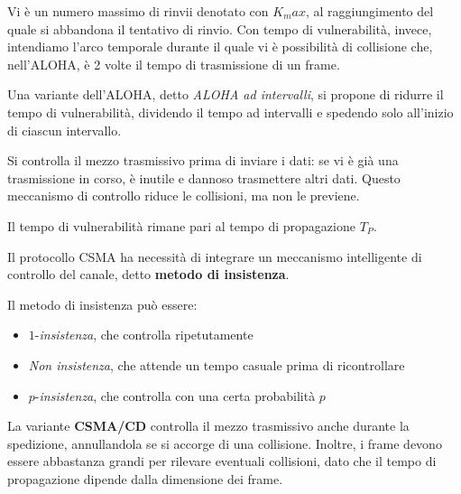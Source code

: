                 Vi è un numero massimo di rinvii denotato con $K_max$, al raggiungimento del quale si abbandona il tentativo di rinvio. Con tempo di vulnerabilità, invece, intendiamo l'arco temporale durante il quale vi è possibilità di collisione che, nell'ALOHA, è 2 volte il tempo di trasmissione di un frame.
                
                \vspace{3mm}
                
                Una variante dell'ALOHA, detto \textit{ALOHA ad intervalli}, si propone di ridurre il tempo di vulnerabilità, dividendo il tempo ad intervalli e spedendo solo all'inizio di ciascun intervallo.
                
            
                Si controlla il mezzo trasmissivo prima di inviare i dati: se vi è già una trasmissione in corso, è inutile e dannoso trasmettere altri dati. Questo meccanismo di controllo riduce le collisioni, ma non le previene.
                
                Il tempo di vulnerabilità rimane pari al tempo di propagazione $T_P$.
                
                \vspace{3mm}
                
                Il protocollo CSMA ha necessità di integrare un meccanismo intelligente di controllo del canale, detto \textbf{metodo di insistenza}.
                
                Il metodo di insistenza può essere:
                
                \begin{itemize}
                    \item 
                    
                        $1$-\textit{insistenza}, che controlla ripetutamente
                    
                    \item 
                        \textit{Non insistenza}, che attende un tempo casuale prima di ricontrollare
                        
                    \item 
                        $p$-\textit{insistenza}, che controlla con una certa probabilità $p$
                \end{itemize}
                
                La variante \textbf{CSMA/CD} controlla il mezzo trasmissivo anche durante la spedizione, annullandola se si accorge di una collisione. Inoltre, i frame devono essere abbastanza grandi per rilevare eventuali collisioni, dato che il tempo di propagazione dipende dalla dimensione dei frame.
                
